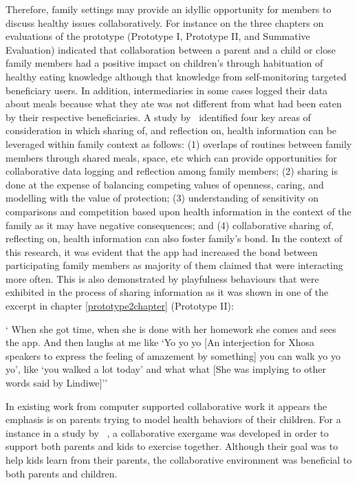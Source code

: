 Therefore, family settings may provide an idyllic opportunity for members to discuss healthy issues collaboratively. For instance on the three chapters on evaluations of the prototype (Prototype I, Prototype II, and Summative Evaluation) indicated that collaboration between a parent and a child or close family members had a positive impact on children's through habituation of healthy eating knowledge although that knowledge from self-monitoring targeted beneficiary users. In addition, intermediaries in some cases logged their data about meals because what they ate was not different from what had been eaten by their respective beneficiaries. A study by~\cite{grimes2009toward} identified four key areas of consideration in which sharing of, and reflection on, health information can be leveraged within family context as follows: (1) overlaps of routines between family members through shared meals, space, etc which can provide opportunities for collaborative data logging and reflection among family members; (2) sharing is done at the expense of balancing competing values of openness, caring, and modelling with the value of protection; (3) understanding of sensitivity on comparisons and competition based upon health information in the context of the family as it may have negative consequences; and (4) collaborative sharing of, reflecting on, health information can also foster family's bond. In the context of this research, it was evident that the app had increased the bond between participating family members as majority of them claimed that were interacting more often. This is also demonstrated by playfulness behaviours that were exhibited in the process of sharing information as it was shown in one of the excerpt in chapter \ref{prototype2chapter} (Prototype II):

 {` When she got time, when she is done with her homework she comes and sees the app. And then laughs at me like `Yo yo yo [An interjection for Xhosa speakers to express the feeling of amazement by something] you can walk yo yo yo', like `you walked a lot today' and what what [She was implying to other words said by Lindiwe]''}

In existing work from computer supported collaborative work it appears the emphasis is on parents trying to model health behaviors of their children.  For a instance in a study by ~\cite{saksono2015spaceship}, a collaborative exergame was developed in order to support both parents and kids to exercise together. Although their goal was to help kids learn from their parents, the collaborative environment was beneficial to both parents and children.


